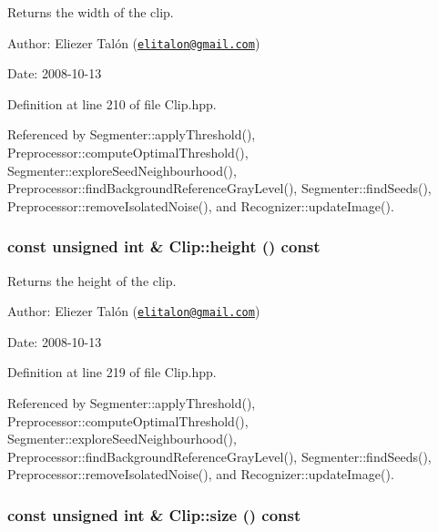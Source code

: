 Returns the width of the clip. 

\begin{Desc}
\item[Author:]Eliezer Talón (\href{mailto:elitalon@gmail.com}{\tt elitalon@gmail.com}) \end{Desc}
\begin{Desc}
\item[Date:]2008-10-13 \end{Desc}


Definition at line 210 of file Clip.hpp.

Referenced by Segmenter::applyThreshold(), Preprocessor::computeOptimalThreshold(), Segmenter::exploreSeedNeighbourhood(), Preprocessor::findBackgroundReferenceGrayLevel(), Segmenter::findSeeds(), Preprocessor::removeIsolatedNoise(), and Recognizer::updateImage().\hypertarget{class_clip_939908a8dde602d25335792cc0fd5d97}{
\subsubsection[height]{\setlength{\rightskip}{0pt plus 5cm}const unsigned int \& Clip::height () const}}
\label{class_clip_939908a8dde602d25335792cc0fd5d97}


Returns the height of the clip. 

\begin{Desc}
\item[Author:]Eliezer Talón (\href{mailto:elitalon@gmail.com}{\tt elitalon@gmail.com}) \end{Desc}
\begin{Desc}
\item[Date:]2008-10-13 \end{Desc}


Definition at line 219 of file Clip.hpp.

Referenced by Segmenter::applyThreshold(), Preprocessor::computeOptimalThreshold(), Segmenter::exploreSeedNeighbourhood(), Preprocessor::findBackgroundReferenceGrayLevel(), Segmenter::findSeeds(), Preprocessor::removeIsolatedNoise(), and Recognizer::updateImage().\hypertarget{class_clip_eb6b12a1a0570b529d6a09633b991fcd}{
\subsubsection[size]{\setlength{\rightskip}{0pt plus 5cm}const unsigned int \& Clip::size () const}}
\label{class_clip_eb6b12a1a0570b529d6a09633b991fcd}


